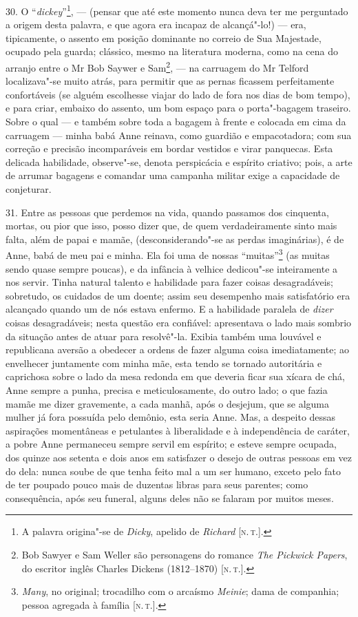 30. O ``\emph{dickey}''\footnote{A palavra origina"-se de \emph{Dicky},
  apelido de \emph{Richard} {[}\textsc{n.\,t.}{]}.}, --- (pensar que até este
momento nunca deva ter me perguntado a origem desta palavra, e que agora
era incapaz de alcançá"-lo!) --- era, tipicamente, o assento em posição
dominante no correio de Sua Majestade, ocupado pela guarda; clássico,
mesmo na literatura moderna, como na cena do arranjo entre o Mr Bob
Saywer e Sam\footnote{Bob Sawyer e Sam Weller são personagens do romance
  \emph{The Pickwick Papers}, do escritor inglês Charles Dickens
  (1812--1870) {[}\textsc{n.\,t.}{]}.}, --- na carruagem do Mr Telford
localizava"-se muito atrás, para permitir que as pernas ficassem
perfeitamente confortáveis (se alguém escolhesse viajar do lado de fora
nos dias de bom tempo), e para criar, embaixo do assento, um bom espaço
para o porta"-bagagem traseiro. Sobre o qual --- e também sobre toda a
bagagem à frente e colocada em cima da carruagem --- minha babá Anne
reinava, como guardião e empacotadora; com sua correção e precisão
incomparáveis em bordar vestidos e virar panquecas. Esta delicada
habilidade, observe"-se, denota perspicácia e espírito criativo; pois, a
arte de arrumar bagagens e comandar uma campanha militar exige a
capacidade de conjeturar.

31. Entre as pessoas que perdemos na vida, quando passamos dos
cinquenta, mortas, ou pior que isso, posso dizer que, de quem
verdadeiramente sinto mais falta, além de papai e mamãe,
(desconsiderando"-se as perdas imaginárias), é de Anne, babá de meu pai e
minha. Ela foi uma de nossas ``muitas''\footnote{\emph{Many}, no
  original; trocadilho com o arcaísmo \emph{Meinie}; dama de companhia;
  pessoa agregada à família {[}\textsc{n.\,t.}{]}.} (as muitas sendo quase
sempre poucas), e da infância à velhice dedicou"-se inteiramente a nos
servir. Tinha natural talento e habilidade para fazer coisas
desagradáveis; sobretudo, os cuidados de um doente; assim seu desempenho
mais satisfatório era alcançado quando um de nós estava enfermo. E a
habilidade paralela de \emph{dizer} coisas desagradáveis; nesta questão
era confiável: apresentava o lado mais sombrio da situação antes de
atuar para resolvê"-la. Exibia também uma louvável e republicana aversão
a obedecer a ordens de fazer alguma coisa imediatamente; ao envelhecer
juntamente com minha mãe, esta tendo se tornado autoritária e caprichosa
sobre o lado da mesa redonda em que deveria ficar sua xícara de chá,
Anne sempre a punha, precisa e meticulosamente, do outro lado; o que
fazia mamãe me dizer gravemente, a cada manhã, após o desjejum, que se
alguma mulher já fora possuída pelo demônio, esta seria Anne. Mas, a
despeito dessas aspirações momentâneas e petulantes à liberalidade e à
independência de caráter, a pobre Anne permaneceu sempre servil em
espírito; e esteve sempre ocupada, dos quinze aos setenta e dois anos em
satisfazer o desejo de outras pessoas em vez do dela: nunca soube de que
tenha feito mal a um ser humano, exceto pelo fato de ter poupado pouco
mais de duzentas libras para seus parentes; como consequência, após seu
funeral, alguns deles não se falaram por muitos meses.

